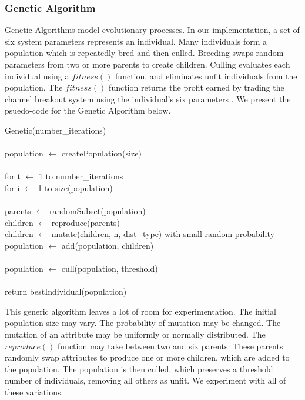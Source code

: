\documentclass[12pt]{article}
\begin{document}
\subsubsection{Genetic Algorithm}

Genetic Algorithms model evolutionary processes.  In our implementation, a set
of six system parameters represents an individual.  Many individuals form a
population which is repeatedly bred and then culled.  Breeding swaps random
parameters from two or more parents to create children.  Culling evaluates each
individual using a $fitness()$ function, and eliminates unfit individuals from
the population.  The $fitness()$ function returns the profit earned by trading
the channel breakout system using the individual's six parameters \cite{Mitchell,RussellNorvig}.  We present
the psuedo-code for the Genetic Algorithm below.

\vspace{10pt}
\setlength{\parindent}{5mm}
\indent Genetic(number\_iterations)\\\\
\indent\indent population $\leftarrow$ createPopulation(size)\\\\
\indent \indent for t $\leftarrow$ 1 to number\_iterations\\
\indent \indent \indent for i $\leftarrow$ 1 to size(population)\\\\
\indent \indent \indent \indent parents $\leftarrow$ randomSubset(population)\\
\indent \indent \indent \indent children $\leftarrow$ reproduce(parents)\\
\indent \indent \indent \indent children $\leftarrow$ mutate(children, n, dist\_type) with small random probability\\
\indent \indent \indent \indent population $\leftarrow$ add(population, children)\\\\
\indent \indent \indent population $\leftarrow$ cull(population, threshold)\\\\
\indent \indent return bestIndividual(population)\\
\setlength{\parindent}{0mm}

This generic algorithm leaves a lot of room for experimentation. The initial
population size may vary.  The probability of mutation may be changed.  The
mutation of an attribute may be uniformly or normally distributed.  The
$reproduce()$ function may take between two and six parents.  These parents
randomly swap attributes to produce one or more children, which are added to the
population.  The population is then culled, which preserves a threshold number
of individuals, removing all others as unfit. We experiment with all of these
variations.
\end{document}
